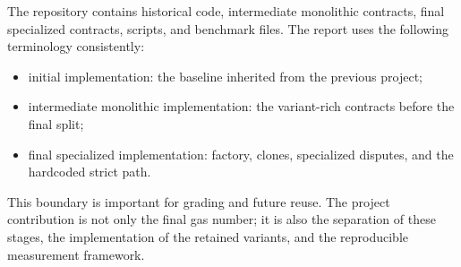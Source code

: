 The repository contains historical code, intermediate monolithic contracts, final
specialized contracts, scripts, and benchmark files. The report uses the following
terminology consistently:

\begin{itemize}
  \item initial implementation: the baseline inherited from the previous project;
  \item intermediate monolithic implementation: the variant-rich contracts before the final split;
  \item final specialized implementation: factory, clones, specialized disputes, and the
  hardcoded strict path.
\end{itemize}

This boundary is important for grading and future reuse. The project contribution is not
only the final gas number; it is also the separation of these stages, the implementation of
the retained variants, and the reproducible measurement framework.

